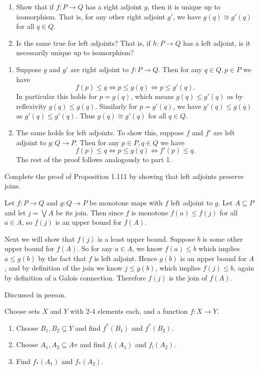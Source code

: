 \begin{enumerate}
	\item Show that if $f:P\to Q$ has a right adjoint $g$, then it is unique up to isomorphism.  That is, for any other right adjoint $g'$, we have $g(q)\cong g'(q)$ for all $q\in Q$.
	\item Is the same true for left adjoints?  That is, if $h:P\to Q$ has a left adjoint, is it necessarily unique up to isomorphism?
\end{enumerate}

\solution
\begin{enumerate}
\item Suppose $g$ and $g'$ are right adjoint to $f:P\to Q$.  Then for any $q\in Q, p\in P$ we have
$$f(p)\leq q\iff p\leq g(q)\iff p\leq g'(q).$$
In particular this holds for $p=g(q)$, which means $g(q)\leq g'(q)$ as by reflexivity $g(q)\leq g(q)$.  Similarly for $p=g'(q)$, we have $g'(q)\leq g(q)$ as $g'(q)\leq g'(q)$.  Thus $g(q)\cong g'(q)$ for all $q\in Q$.

\item The same holds for left adjoints.  To show this, suppose $f$ and $f'$ are left adjoint to $g:Q\to P$.  Then for any $p\in P,q\in Q$ we have
$$f(p)\leq q\iff p\leq g(q)\iff f'(p)\leq q.$$
The rest of the proof follows analogously to part 1.
\end{enumerate}

Complete the proof of Proposition 1.111 by showing that left adjoints preserve joins.

\solution
Let $f:P\to Q$ and $g:Q\to P$ be monotone maps with $f$ left adjoint to $g$.  Let $A\subseteq P$ and let $j = \bigvee A$ be its join.  Then since $f$ is monotone $f(a)\leq f(j)$ for all $a\in A$, so $f(j)$ is an upper bound for $f(A)$.

Next we will show that $f(j)$ is a least upper bound.  Suppose $b$ is some other upper bound for $f(A)$.  So for any $a\in A$, we know $f(a)\leq b$ which implies $a\leq g(b)$ by the fact that $f$ is left adjoint.  Hence $g(b)$ is an upper bound for $A$, and by definition of the join we know $j\leq g(b)$, which implies $f(j)\leq b$, again by definition of a Galois connection.  Therefore $f(j)$ is the join of $f(A)$.

Discussed in person.

Choose sets $X$ and $Y$ with 2-4 elements each, and a function $f:X\to Y$.
\begin{enumerate}
	\item Choose $B_1,B_2\subseteq Y$ and find $f^*(B_1)$ and $f^*(B_2)$.
	\item Choose $A_1, A_2\subseteq A$v and find $f_!(A_1)$ and $f_!(A_2)$.
	\item Find $f_*(A_1)$ and $f_*(A_2)$.
\end{enumerate}


